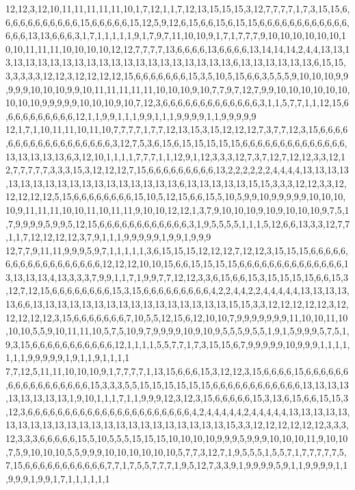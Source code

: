 12,12,3,12,10,11,11,11,11,11,10,1,7,12,1,1,7,12,13,15,15,15,3,12,7,7,7,7,1,7,3,15,15,6,6,6,6,6,6,6,6,6,6,6,15,6,6,6,6,6,15,12,5,9,12,6,15,6,6,15,6,15,15,6,6,6,6,6,6,6,6,6,6,6,6,6,6,6,13,13,6,6,6,3,1,7,1,1,1,1,1,9,1,7,9,7,11,10,10,9,1,7,1,7,7,7,9,10,10,10,10,10,10,10,10,11,11,11,10,10,10,10,12,12,7,7,7,7,13,6,6,6,6,13,6,6,6,6,13,14,14,14,2,4,4,13,13,13,13,13,13,13,13,13,13,13,13,13,13,13,13,13,13,13,13,13,6,13,13,13,13,13,13,6,15,15,3,3,3,3,3,12,12,3,12,12,12,12,15,6,6,6,6,6,6,6,15,3,5,10,5,15,6,6,3,5,5,5,9,10,10,10,9,9,9,9,9,10,10,10,9,9,10,11,11,11,11,11,10,10,10,9,10,7,7,9,7,12,7,9,9,10,10,10,10,10,10,10,10,10,9,9,9,9,9,10,10,10,9,10,7,12,3,6,6,6,6,6,6,6,6,6,6,6,6,6,3,1,1,5,7,7,1,1,12,15,6,6,6,6,6,6,6,6,6,6,12,1,1,9,9,1,1,1,9,9,1,1,1,9,9,9,9,1,1,9,9,9,9,9
12,1,7,1,10,11,11,10,11,10,7,7,7,7,1,7,7,12,13,15,3,15,12,12,12,7,3,7,7,12,3,15,6,6,6,6,6,6,6,6,6,6,6,6,6,6,6,6,6,6,3,12,7,5,3,6,15,6,15,15,15,15,15,6,6,6,6,6,6,6,6,6,6,6,6,6,6,13,13,13,13,13,6,3,12,10,1,1,1,1,7,7,7,1,1,12,9,1,12,3,3,3,12,7,3,7,12,7,12,12,3,3,12,12,7,7,7,7,7,3,3,3,15,3,12,12,12,7,15,6,6,6,6,6,6,6,6,6,13,2,2,2,2,2,2,4,4,4,4,13,13,13,13,13,13,13,13,13,13,13,13,13,13,13,13,13,13,6,13,13,13,13,13,15,15,3,3,3,12,12,3,3,12,12,12,12,12,5,15,6,6,6,6,6,6,6,6,15,10,5,12,15,6,6,15,5,10,5,9,9,10,9,9,9,9,9,10,10,10,10,9,11,11,11,10,10,11,10,11,11,9,10,10,12,12,1,3,7,9,10,10,10,9,10,9,10,10,10,9,7,5,1,7,9,9,9,9,5,9,9,5,12,15,6,6,6,6,6,6,6,6,6,6,6,6,3,1,9,5,5,5,5,1,1,1,5,12,6,6,13,3,3,12,7,7,1,1,7,12,12,12,12,3,7,9,1,1,1,9,9,9,9,9,1,9,9,1,9,9,9
12,7,7,9,11,11,9,9,9,5,9,7,1,1,1,1,1,3,6,15,15,15,12,12,12,7,12,12,3,15,15,15,6,6,6,6,6,6,6,6,6,6,6,6,6,6,6,6,6,6,12,12,12,10,10,15,6,6,15,15,15,15,6,6,6,6,6,6,6,6,6,6,6,6,6,6,13,13,13,13,4,13,3,3,3,7,9,9,1,1,7,1,9,9,7,7,12,12,3,3,6,15,6,6,15,3,15,15,15,15,6,6,15,3,12,7,12,15,6,6,6,6,6,6,6,6,15,3,15,6,6,6,6,6,6,6,6,6,4,2,2,4,4,2,2,4,4,4,4,4,13,13,13,13,13,6,6,13,13,13,13,13,13,13,13,13,13,13,13,13,13,13,13,15,15,3,3,12,12,12,12,12,3,12,12,12,12,12,3,15,6,6,6,6,6,6,6,7,10,5,5,12,15,6,12,10,10,7,9,9,9,9,9,9,9,11,10,10,11,10,10,10,5,5,9,10,11,11,10,5,7,5,10,9,7,9,9,9,9,10,9,10,9,5,5,5,9,5,5,1,9,1,5,9,9,9,5,7,5,1,9,3,15,6,6,6,6,6,6,6,6,6,6,6,12,1,1,1,1,5,5,7,7,1,7,3,15,15,6,7,9,9,9,9,9,10,9,9,9,1,1,1,1,1,1,1,9,9,9,9,9,1,9,1,1,9,1,1,1,1
7,7,12,5,11,11,10,10,10,9,1,7,7,7,7,1,13,15,6,6,6,15,3,12,12,3,15,6,6,6,6,15,6,6,6,6,6,6,6,6,6,6,6,6,6,6,6,6,6,15,3,3,3,5,5,15,15,15,15,15,15,6,6,6,6,6,6,6,6,6,6,6,6,13,13,13,13,13,13,13,13,13,1,9,10,1,1,1,7,1,1,9,9,9,12,3,12,3,15,6,6,6,6,6,15,3,13,6,15,6,6,15,15,3,12,3,6,6,6,6,6,6,6,6,6,6,6,6,6,6,6,6,6,6,6,6,6,6,4,2,4,4,4,4,4,2,4,4,4,4,4,13,13,13,13,13,13,13,13,13,13,13,13,13,13,13,13,13,13,13,13,13,13,13,15,3,3,12,12,12,12,12,12,3,3,3,12,3,3,3,6,6,6,6,6,15,5,10,5,5,5,15,15,15,10,10,10,10,9,9,9,5,9,9,9,10,10,10,11,9,10,10,7,5,9,10,10,10,5,5,9,9,9,10,10,10,10,10,10,5,7,7,3,12,7,1,9,5,5,5,1,5,5,7,1,7,7,7,7,7,5,7,15,6,6,6,6,6,6,6,6,6,6,6,7,7,1,7,5,5,7,7,7,1,9,5,12,7,3,3,9,1,9,9,9,9,5,9,1,1,9,9,9,9,1,1,9,9,9,1,9,9,1,7,1,1,1,1,1,1
